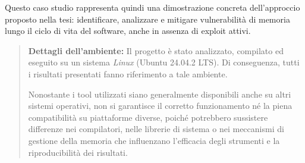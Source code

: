 Questo caso studio rappresenta quindi una dimostrazione concreta dell'approccio
proposto nella tesi: identificare, analizzare e mitigare vulnerabilità di
memoria lungo il ciclo di vita del software, anche in assenza di exploit attivi.

\begin{quote}
  \textbf{Dettagli dell'ambiente:} Il progetto è stato analizzato, compilato ed eseguito
  su un sistema \textit{Linux} (Ubuntu 24.04.2 LTS). Di conseguenza, tutti i risultati
  presentati fanno riferimento a tale ambiente.

  Nonostante i tool utilizzati siano generalmente disponibili anche su altri sistemi
  operativi, non si garantisce il corretto funzionamento né la piena
  compatibilità su piattaforme diverse, poiché potrebbero sussistere differenze nei
  compilatori, nelle librerie di sistema o nei meccanismi di gestione della
  memoria che influenzano l'efficacia degli strumenti e la riproducibilità dei
  risultati.
\end{quote}


